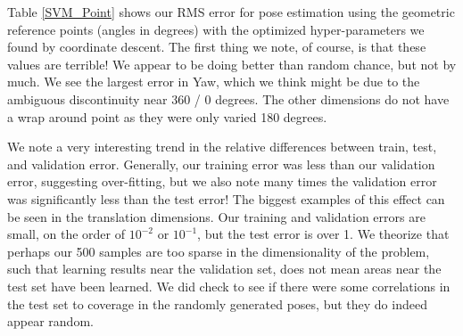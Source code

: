 \documentclass[journal]{IEEEtran}
\begin{document}
Table \ref{SVM_Point} shows our RMS error for pose estimation using the geometric reference points (angles in degrees) with the optimized hyper-parameters we found by coordinate descent. The first thing we note, of course, is that these values are terrible! We appear to be doing better than random chance, but not by much. We see the largest error in Yaw, which we think might be due to the ambiguous discontinuity near 360 / 0 degrees. The other dimensions do not have a wrap around point as they were only varied 180 degrees.

We note a very interesting trend in the relative differences between train, test, and validation error. Generally, our training error was less than our validation error, suggesting over-fitting, but we also note many times the validation error was significantly less than the test error! The biggest examples of this effect can be seen in the translation dimensions. Our training and validation errors are small, on the order of $10^{-2}$ or $10^{-1}$, but the test error is over 1. We theorize that perhaps our 500 samples are too sparse in the dimensionality of the problem, such that learning results near the validation set, does not mean areas near the test set have been learned. We did check to see if there were some correlations in the test set to coverage in the randomly generated poses, but they do indeed appear random.
\end{document}
